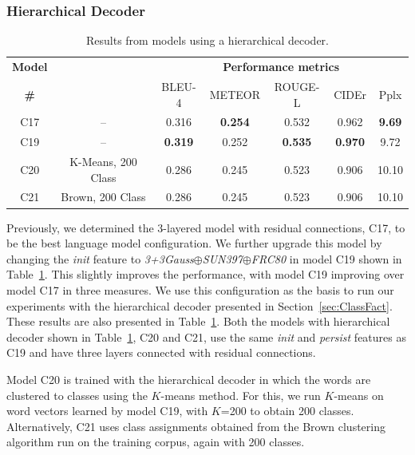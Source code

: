 \subsubsection{Hierarchical Decoder}
\begin{table}[htp]
  \centering
  \newcommand{\bs}{\small}
  \begin{adjustbox}{center}
  \begin{tabular}{|c|c|c|c|c|c|c|}
    \hline
    \bf Model & \bf \multirow{2}{*}{Class clustering} & \multicolumn{5}{c|}{\bf Performance metrics}\\
    \cline{3-7}
    \bf \# &\bf &\bs BLEU-4 &\bs METEOR &\bs ROUGE-L &\bs CIDEr&\bs Pplx \\\hline
    C17 & --    & 0.316 &\bf0.254&0.532 & 0.962   &\bf9.69  \\
    C19 & --    &\bf0.319 & 0.252 &\bf0.535 &\bf0.970 & 9.72 \\\hline
    C20 &\parbox[c][][c]{4cm}{\smallskip\centering K-Means, 200 Class \smallskip} 
                             & 0.286 & 0.245 & 0.523 & 0.906 & 10.10 \\\hline
    C21 &\parbox[c][][c]{4cm}{\smallskip\centering Brown, 200 Class\smallskip} 
                             & 0.286 & 0.245 & 0.523 & 0.906 & 10.10 \\\hline
  \end{tabular}
  \end{adjustbox}
  \caption{Results from models using a hierarchical decoder.}
  \label{tab:resClsCocValset}
\end{table}

Previously, we determined the 3-layered model with residual connections,
C17, to be the best language model configuration.
We further upgrade this model by changing the \emph{init} feature to
\emph{3+3Gauss$\oplus$SUN397$\oplus$FRC80} in model C19 shown in
Table~\ref{tab:resClsCocValset}.
This slightly improves the performance, with model C19 improving over model C17
in three measures. 
We use this configuration as the basis to run our experiments with the
hierarchical decoder presented in Section~\ref{sec:ClassFact}.
These results are also presented in Table~\ref{tab:resClsCocValset}.
Both the models with hierarchical decoder shown in
Table~\ref{tab:resClsCocValset}, C20 and C21, use the same \emph{init} and
\emph{persist} features as C19 and have three layers connected with residual
connections.

Model C20 is trained with the hierarchical decoder in which the words are
clustered to classes using the $K$-means method. 
For this, we run $K$-means on word vectors learned by model C19, with $K$=200 to
obtain 200 classes. 
Alternatively, C21 uses class assignments obtained from the Brown clustering
algorithm run on the training corpus, again with 200 classes.


